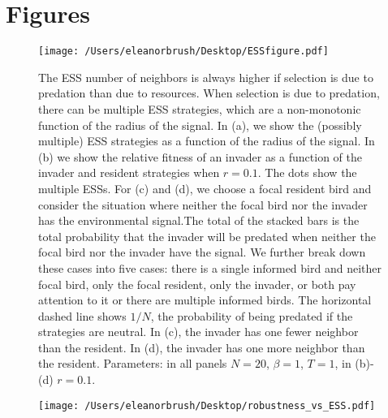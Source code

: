 \documentclass{article}
\begin{document}
\newpage
\section{Figures }
\begin{figure}
\texttt{[image: /Users/eleanorbrush/Desktop/ESSfigure.pdf]}
\caption{\label{ESS} The ESS number of neighbors is always higher if selection is due to predation than due to resources. When selection is due to predation, there can be multiple ESS strategies, which are a non-monotonic function of the radius of the signal. In (a), we show the (possibly multiple) ESS strategies as a function of the radius of the signal. In (b) we show the relative fitness of an invader as a function of the invader and resident strategies when $r=0.1$. The dots show the multiple ESSs. For (c) and (d), we choose a focal resident bird and consider the situation where neither the focal bird nor the invader has the environmental signal.The total of the stacked bars is the total probability that the invader will be predated when neither the focal bird nor the invader have the signal.  We further break down these cases into five cases: there is a single informed bird and neither focal bird, only the focal resident, only the invader, or both pay attention to it or there are multiple informed birds. The horizontal dashed line shows $1/N$, the probability of being predated if the strategies are neutral. In (c), the invader has one fewer neighbor than the resident. In (d), the invader has one more neighbor than the resident. Parameters:  in all panels $N=20$, $\beta=1$, $T=1$, in (b)-(d) $r=0.1$. 
}
\end{figure}

\begin{figure}
\texttt{[image: /Users/eleanorbrush/Desktop/robustness\_vs\_ESS.pdf]}
\caption{\label{corrESS}
}
\end{figure}
\end{document}
